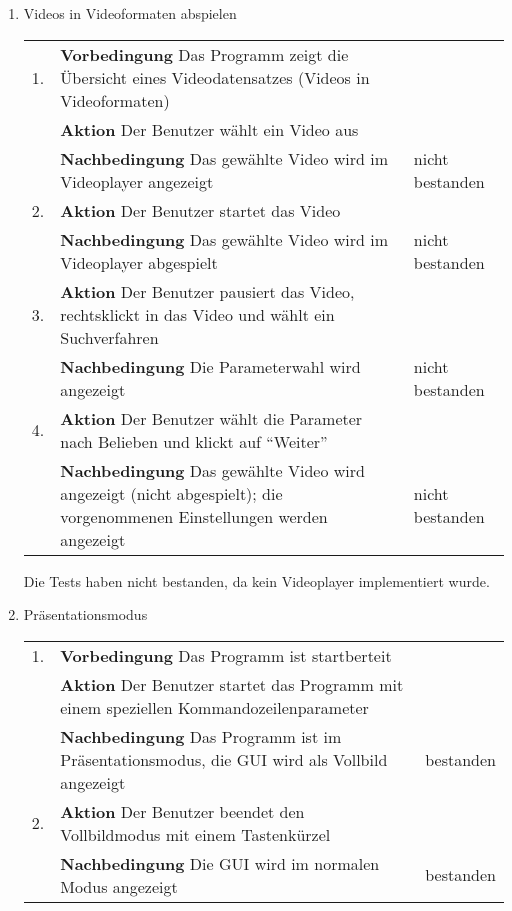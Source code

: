 \begin{enumerate} [label=\bfseries /TSW \arabic*0/, leftmargin=*]
	\item Videos in Videoformaten abspielen \newline \newline
	\begin{tabular}{@{}rp{4in}|l}
	1. & \textbf{Vorbedingung} Das Programm zeigt die Übersicht eines Videodatensatzes (Videos in Videoformaten) & \\
	   & \textbf{Aktion} Der Benutzer wählt ein Video aus & \\
	   & \textbf{Nachbedingung} Das gewählte Video wird im Videoplayer angezeigt & nicht bestanden \\
	\hline
	2. & \textbf{Aktion} Der Benutzer startet das Video & \\
	   & \textbf{Nachbedingung} Das gewählte Video wird im Videoplayer abgespielt & nicht bestanden \\
	\hline
	3. & \textbf{Aktion} Der Benutzer pausiert das Video, rechtsklickt in das Video und wählt ein Suchverfahren & \\
	   & \textbf{Nachbedingung} Die Parameterwahl wird angezeigt & nicht bestanden \\
	\hline
	4. & \textbf{Aktion} Der Benutzer wählt die Parameter nach Belieben und klickt auf \enquote{Weiter} & \\
	   & \textbf{Nachbedingung} Das gewählte Video wird angezeigt (nicht abgespielt); die vorgenommenen Einstellungen werden angezeigt & nicht bestanden \\
	\end{tabular}
	\par
Die Tests haben nicht bestanden, da kein Videoplayer implementiert wurde.
	\pagebreak

	\item Präsentationsmodus \newline \newline
	\begin{tabular}{@{}rp{4in}|l}
	1. & \textbf{Vorbedingung} Das Programm ist startberteit & \\
	   & \textbf{Aktion} Der Benutzer startet das Programm mit einem speziellen Kommandozeilenparameter & \\
	   & \textbf{Nachbedingung} Das Programm ist im Präsentationsmodus, die GUI wird als Vollbild angezeigt & bestanden \\
	\hline
	2. & \textbf{Aktion} Der Benutzer beendet den Vollbildmodus mit einem Tastenkürzel & \\
	   & \textbf{Nachbedingung}	Die GUI wird im normalen Modus angezeigt & bestanden \\
	\end{tabular}
	\newline


\end{enumerate}
